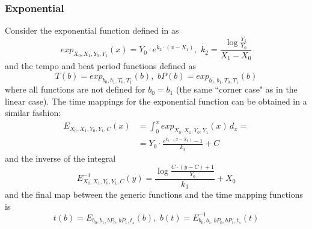 \documentclass{sig-alternate}
\begin{document}
\subsubsection{Exponential}
Consider the exponential function defined in \cite{wheresthebeat} as
\begin{equation}
exp_{X_0,X_1,Y_0,Y_1}(x) = Y_0 \cdot e^{k_2 \cdot (x - X_1)},\,\,k_2 =\frac{ \log{\frac{Y_1}{Y_0}}}{X_1 - X_0}
\end{equation}
and the tempo and beat period functions defined as 
\begin{displaymath}
T(b)=exp_{b_0,b_1,T_0,T_1}(b),\,\,bP(b)=exp_{b_0,b_1,T_0,T_1}(b)
\end{displaymath}
where all functions are not defined for $b_0=b_1$ (the same ``corner case" as in the linear case). The time mappings for the exponential function can be obtained in a similar fashion:
\begin{equation}
\begin{split}
	E_{X_0,X_1,Y_0,Y_1,C}(x) &=\int_{0}^{x} exp_{X_0,X_1,Y_0,Y_1}(x)\,d_x = \\
	&= Y_0 \cdot \frac{e^{k_3 \cdot (x-X_0)} - 1}{k_3} +C
\end{split}
\end{equation}
and the inverse of the integral
\begin{equation}
E_{X_0,X_1,Y_0,Y_1,C}^{-1}(y) = \frac{\log{\frac{C \cdot (y - C) + 1}{Y_0}}}{k_3} + X_0
\end{equation}
and the final map between the generic functions and the time mapping functions is
\begin{displaymath}
t(b) = E_{b_0,b_1,bP_0,bP_1,t_s}(b),\,\,b(t) = E_{b_0,b_1,bP_0,bP_1,t_s}^{-1}(t)
\end{displaymath}
\end{document}
